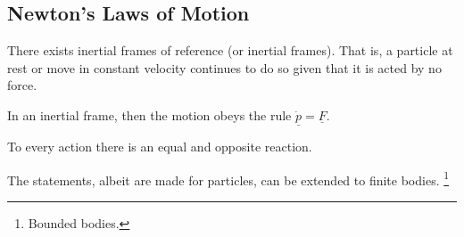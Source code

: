 \subsection{Newton's Laws of Motion}
\begin{law}
    There exists inertial frames of reference (or inertial frames).
    That is, a particle at rest or move in constant velocity continues to do so given that it is acted by no force.
\end{law}
\begin{law}
    In an inertial frame, then the motion obeys the rule $\underline{\dot{p}}=\underline{F}$.
\end{law}
\begin{law}
    To every action there is an equal and opposite reaction.
\end{law}
The statements, albeit are made for particles, can be extended to finite bodies.
\footnote{Bounded bodies.}
